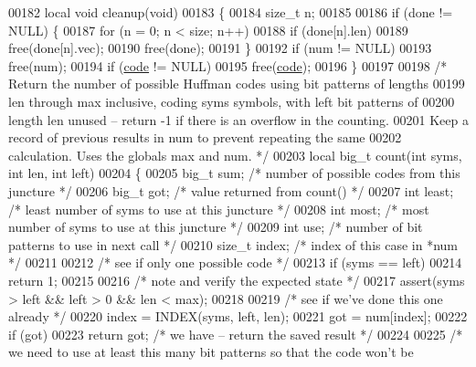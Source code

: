 \begin{DoxyCode}
00182 local \textcolor{keywordtype}{void} cleanup(\textcolor{keywordtype}{void})
00183 \{
00184     \textcolor{keywordtype}{size\_t} n;
00185 
00186     \textcolor{keywordflow}{if} (done != NULL) \{
00187         \textcolor{keywordflow}{for} (n = 0; n < size; n++)
00188             \textcolor{keywordflow}{if} (done[n].len)
00189                 free(done[n].vec);
00190         free(done);
00191     \}
00192     \textcolor{keywordflow}{if} (num != NULL)
00193         free(num);
00194     \textcolor{keywordflow}{if} (\hyperlink{structcode}{code} != NULL)
00195         free(\hyperlink{structcode}{code});
00196 \}
00197 
00198 \textcolor{comment}{/* Return the number of possible Huffman codes using bit patterns of lengths}
00199 \textcolor{comment}{   len through max inclusive, coding syms symbols, with left bit patterns of}
00200 \textcolor{comment}{   length len unused -- return -1 if there is an overflow in the counting.}
00201 \textcolor{comment}{   Keep a record of previous results in num to prevent repeating the same}
00202 \textcolor{comment}{   calculation.  Uses the globals max and num. */}
00203 local big\_t count(\textcolor{keywordtype}{int} syms, \textcolor{keywordtype}{int} len, \textcolor{keywordtype}{int} left)
00204 \{
00205     big\_t sum;          \textcolor{comment}{/* number of possible codes from this juncture */}
00206     big\_t got;          \textcolor{comment}{/* value returned from count() */}
00207     \textcolor{keywordtype}{int} least;          \textcolor{comment}{/* least number of syms to use at this juncture */}
00208     \textcolor{keywordtype}{int} most;           \textcolor{comment}{/* most number of syms to use at this juncture */}
00209     \textcolor{keywordtype}{int} use;            \textcolor{comment}{/* number of bit patterns to use in next call */}
00210     \textcolor{keywordtype}{size\_t} index;       \textcolor{comment}{/* index of this case in *num */}
00211 
00212     \textcolor{comment}{/* see if only one possible code */}
00213     \textcolor{keywordflow}{if} (syms == left)
00214         \textcolor{keywordflow}{return} 1;
00215 
00216     \textcolor{comment}{/* note and verify the expected state */}
00217     assert(syms > left && left > 0 && len < max);
00218 
00219     \textcolor{comment}{/* see if we've done this one already */}
00220     index = INDEX(syms, left, len);
00221     got = num[index];
00222     \textcolor{keywordflow}{if} (got)
00223         \textcolor{keywordflow}{return} got;         \textcolor{comment}{/* we have -- return the saved result */}
00224 
00225     \textcolor{comment}{/* we need to use at least this many bit patterns so that the code won't be}

\end{DoxyCode}
